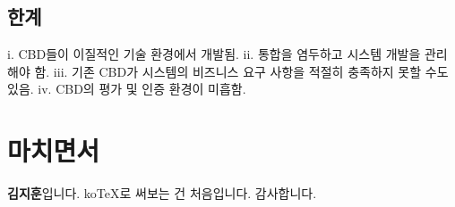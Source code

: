 \documentclass[a4paper,12pt]{article}
\begin{document}
\subsection{한계}
i. CBD들이 이질적인 기술 환경에서 개발됨.
\newline
ii. 통합을 염두하고 시스템 개발을 관리해야 함.
\newline
iii. 기존 CBD가 시스템의 비즈니스 요구 사항을 적절히 충족하지 못할 수도 있음.
\newline
iv. CBD의 평가 및 인증 환경이 미흡함.
\newline
\newline
\newline


\section{마치면서}
\textbf{김지훈}입니다.
\newline
koTeX로 써보는 건 처음입니다.
\newline
감사합니다. 
\end{document}
